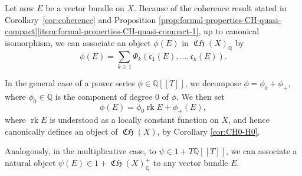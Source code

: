\documentclass[JEP,XML,SOM,Unicode,published]{cedram}
\newcommand{\llbracket}{[\![}
\newcommand{\rrbracket}{]\!]}
\theoremstyle{plain}
\theoremstyle{definition}
\newcommand{\QBbb}{\mathbb Q}
\newcommand{\cfrak}{\mathfrak c}
\DeclareMathOperator{\CHfrak}{\mathfrak{CH}}
\DeclareMathOperator{\rk}{rk}
\begin{document}
Let now $E$ be a vector bundle on $X$. Because of the coherence result stated in Corollary~\ref{cor:coherence} and Proposition \ref{prop:formal-properties-CH-quasi-compact}\eqref{item:formal-properties-CH-quasi-compact-1}, up to canonical isomorphism, we can associate an object $\phi(E)$ in $\CHfrak(X)_{\QBbb}$ by
\begin{displaymath}
\phi(E)=\sum_{k\geq 1}\Phi_{k}(\cfrak_{1}(E),\ldots, \cfrak_{k}(E)).
\end{displaymath}

In the general case of a power series $\phi\in\QBbb\llbracket T\rrbracket$, we decompose $\phi=\phi_{0}+\phi_{+}$, where $\phi_{0}\in\QBbb$ is the component of degree 0 of $\phi$. We then set
\begin{displaymath}
\phi(E)=\phi_{0}\rk E +\phi_{+}(E),
\end{displaymath}
where $\rk E$ is understood as a locally constant function on $X$, and hence canonically defines an object of $\CHfrak(X)$, by Corollary \ref{cor:CH0-H0}.

Analogously, in the multiplicative case, to $\psi\in 1+T\QBbb\llbracket T\rrbracket$, we can associate a natural object $\psi(E) \in 1+\CHfrak(X)_{\QBbb}^{+}$ to any vector bundle $E$.
\end{document}
